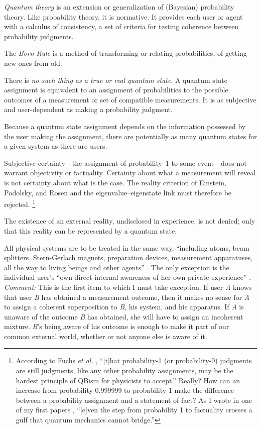 \documentclass[12pt]{article}
\begin{document}
 \item \emph{Quantum theory} is an extension or generalization of (Bayesian) probability theory. Like probability theory, it is normative. It provides each user or agent with a calculus of consistency, a set of criteria for testing coherence between probability judgments.
\item The \emph{Born Rule} is a method of transforming or relating probabilities, of getting new ones from old.
\item  There is \emph{no such thing as a true or real quantum state}. A quantum state assignment is equivalent to an assignment of probabilities to the possible outcomes of a measurement or set of compatible measurements. It is as subjective and user-dependent as making a probability judgment.
\item Because a quantum state assignment depends on the information possessed by the user making the assignment, there are potentially as many quantum states for a given system as there are users.
\item Subjective certainty---the assignment of probability~1 to some event---does not warrant objectivity or factuality. Certainty about what a measurement will reveal is not certainty about what is the case. The reality criterion of Einstein, Podolsky, and Rosen \cite{EPR} and the eigenvalue--eigenstate link \cite{Gilton2016} must therefore be rejected.%
\footnote{According to Fuchs \emph{et al.} \cite{FMS2014}, ``[t]hat probability-1 (or probability-0) judgments are still judgments, like any other probability assignments, may be the hardest principle of QBism for physicists to accept.'' Really? How can an increase from probability 0.999999 to probability 1 make the difference between a probability assignment and a statement of fact? As I wrote in one of my first papers \cite{WQMITTU}, ``[e]ven the step from probability 1 to factuality crosses a gulf that quantum mechanics cannot bridge.''}
\item The existence of an external reality, undisclosed in experience, is not denied; only that this reality can be represented by a quantum state.
\item All physical systems are to be treated in the same way, ``including atoms, beam splitters, Stern-Gerlach magnets, preparation devices, measurement apparatuses, all the way to living beings and other agents'' \cite{FS2015}. The only exception is the individual user's ``own direct internal awareness of her own private experience'' \cite{FMS2014}.\hfill\break
\emph{Comment:} This is the first item to which I must take exception. If user \emph{A} knows that user \emph{B} has obtained a measurement outcome, then it makes no sense for \emph{A} to assign a coherent superposition to \emph{B}, his system, and his apparatus. If \emph{A} is unaware of the outcome \emph{B} has obtained, she will have to assign an incoherent mixture. \emph{B}'s being aware of his outcome is enough to make it part of our common external world, whether or not anyone else is aware of it.
\end{document}
